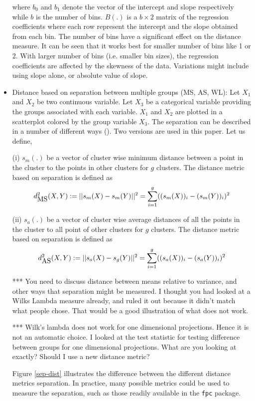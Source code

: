 \documentclass[12]{article}
\newcommand{\red}[1]{{\color{red} #1}}
\newcommand{\green}[1]{{\color{cyan} #1}}
\begin{document}
\begin{itemize}
where $b_0$ and $b_1$ denote the vector of the intercept and slope respectively while $b$ is the number of bins. $B(.)$ is a $b \times 2$ matrix of the regression coefficients where each row represent the  intercept and the slope obtained from each bin. The number of bins have a significant effect on the distance measure. It can be seen that it works best for smaller number of bins like 1 or 2. With larger number of bins (i.e. smaller bin sizes), the regression coefficients are affected by the skewness of the data. Variations might include using slope alone, or absolute value of slope.

\item Distance based on separation between multiple groups (MS, AS, WL): Let $X_1$ and $X_2$ be two continuous variable. Let $X_3$ be a categorical variable providing the groups associated with each variable. $X_1$ and $X_2$ are plotted in a scatterplot colored by the group variable $X_3$. The separation can be described in a number of different ways (\cite{hennig:2010}). Two versions are used in this paper. Let us define, 

(i) $s_{m}(.)$ be a vector of cluster wise minimum distance between a point in the cluster to the points in other clusters for $g$ clusters. The distance metric based on separation is defined as
\[
d^2_{\hbox{MS}}(X, Y):= ||s_m(X) - s_m(Y)||^2 = \sum_{i = 1}^g ((s_m(X))_i - (s_m(Y))_i)^2
\]

(ii)  $s_{a}(.)$ be a vector of cluster wise average distances of all the points in the cluster to all point of other clusters for $g$ clusters. The distance metric based on separation is defined as
\[
d^2_{\hbox{AS}}(X, Y):= ||s_a(X) - s_g(Y)||^2 = \sum_{i = 1}^g ((s_a(X))_i - (s_a(Y))_i)^2
\]

\red{*** You need to discuss distance between means relative to variance, and other ways that separation might be measured. I thought you had looked at a Wilks Lambda measure already, and ruled it out because it didn't match what people chose. That would be a good illustration of what does not work.} 

\green{*** Wilk's lambda does not work for one dimensional projections. Hence it is not an automatic choice. I looked at the test statistic for testing difference between groups for one dimensional projections. What are you looking at exactly? Should I use a new distance metric? }

Figure \ref{sep-dist} illustrates the difference between the different distance metrics separation. In practice, many possible metrics could be used to measure the separation, such as those readily available in the {\tt fpc} package.


\end{itemize}
\end{document}
